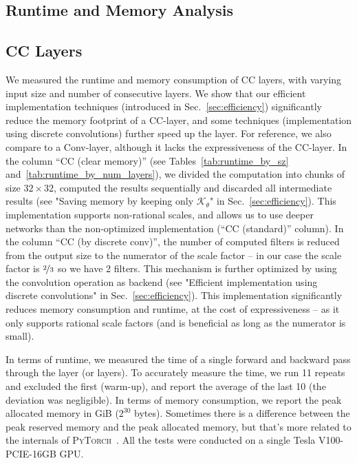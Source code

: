 \begin{appendices}

\section{Runtime and Memory Analysis}
\subsection{CC Layers}
We measured the runtime and memory consumption of CC layers, with varying input size and number of consecutive layers. We show that our efficient implementation techniques (introduced in Sec.~\ref{sec:efficiency}) significantly reduce the memory footprint of a CC-layer, and some techniques (implementation using discrete convolutions) further speed up the layer. For reference, we also compare to a Conv-layer, although it lacks the expressiveness of the CC-layer. In the column ``CC (clear memory)'' (see Tables~\ref{tab:runtime_by_sz} and~\ref{tab:runtime_by_num_layers}), we divided the computation into chunks of size $32\times32$, computed the results sequentially and discarded all intermediate results (see "Saving memory by keeping only $\mathcal{K}_\theta$" in Sec.~\ref{sec:efficiency}). This implementation supports non-rational scales, and allows us to use deeper networks than the non-optimized implementation (``CC (standard)'' column). In the column ``CC (by discrete conv)'', the number of computed filters is reduced from the output size to the numerator of the scale factor -- in our case the scale factor is $\nicefrac{2}{3}$ so we have 2 filters. This mechanism is further optimized by using the convolution operation as backend (see "Efficient implementation using discrete convolutions" in Sec.~\ref{sec:efficiency}). This implementation significantly reduces memory consumption and runtime, at the cost of expressiveness -- as it only supports rational scale factors (and is beneficial as long as the numerator is small).

In terms of runtime, we measured the time of a single forward and backward pass through the layer (or layers). To accurately measure the time, we run 11 repeats and excluded the first (warm-up), and report the average of the last 10 (the deviation was negligible). In terms of memory consumption, we report the peak allocated memory in GiB ($2^{30}$ bytes). Sometimes there is a difference between the peak reserved memory and the peak allocated memory, but that's more related to the internals of \textsc{PyTorch}~\cite{paszke2017automatic}. All the tests were conducted on a single Tesla V100-PCIE-16GB GPU.


\end{appendices}
